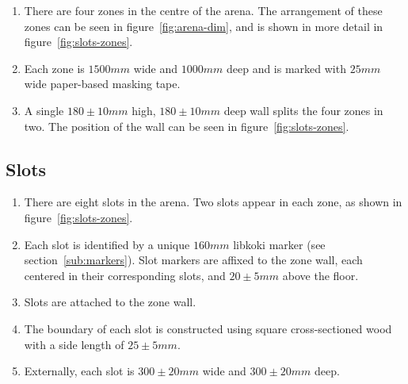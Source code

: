 \begin{enumerate}
\item There are four zones in the centre of the arena.
      The arrangement of these zones can be seen in figure~\ref{fig:arena-dim}, and is shown in more detail in figure~\ref{fig:slots-zones}.

\item Each zone is $1500mm$ wide and $1000mm$ deep and is  marked with $25mm$ wide paper-based masking tape.

\item A single $180 \pm 10mm$ high, $180 \pm 10mm$ deep wall splits the four zones in two.
      The position of the wall can be seen in figure~\ref{fig:slots-zones}.
\end{enumerate}


\subsection{Slots}
\label{sub:slots}

\begin{enumerate}
\item There are eight slots in the arena.
      Two slots appear in each zone, as shown in figure~\ref{fig:slots-zones}.

\item Each slot is identified by a unique $160mm$ libkoki marker (see section~\ref{sub:markers}).
      Slot markers are affixed to the zone wall, each centered in their corresponding slots, and $20 \pm 5mm$ above the floor.

\item Slots are attached to the zone wall.

\item The boundary of each slot is constructed using square cross-sectioned wood with a side length of $25 \pm 5mm$.

\item Externally, each slot is $300 \pm 20mm$ wide and $300 \pm 20mm$ deep.

\end{enumerate}


